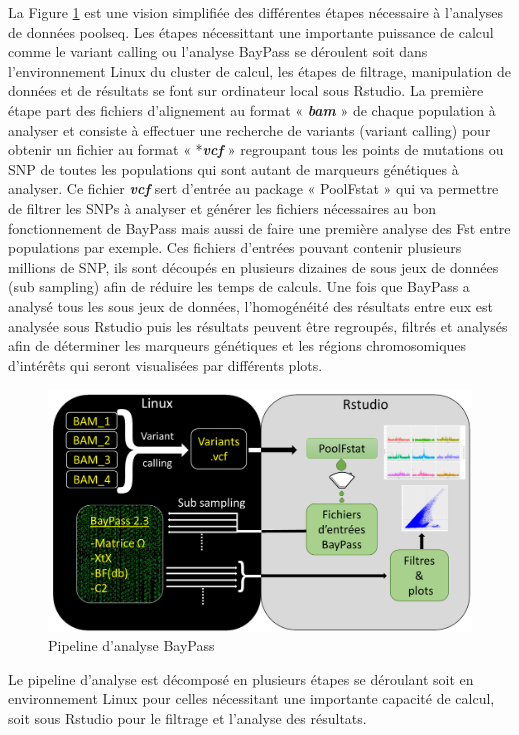\documentclass[
  openany]{book}
\theoremstyle{definition}
\theoremstyle{definition}
\theoremstyle{definition}
\theoremstyle{definition}
\theoremstyle{remark}
\begin{document}
La Figure \ref{fig:Fig1} est une vision simplifiée des différentes étapes nécessaire à l'analyses de données poolseq. Les étapes nécessittant une importante puissance de calcul comme le variant calling ou l'analyse BayPass se déroulent soit dans l'environnement Linux du cluster de calcul, les étapes de filtrage, manipulation de données et de résultats se font sur ordinateur local sous Rstudio.
La première étape part des fichiers d'alignement au format « \textbf{\emph{bam}} » de chaque population à analyser et consiste à effectuer une recherche de variants (variant calling) pour obtenir un fichier au format « *\textbf{\emph{vcf}} » regroupant tous les points de mutations ou SNP de toutes les populations qui sont autant de marqueurs génétiques à analyser. Ce fichier \textbf{\emph{vcf}} sert d'entrée au package « PoolFstat » \citep{gautier_f-statistics_2022} qui va permettre de filtrer les SNPs à analyser et générer les fichiers nécessaires au bon fonctionnement de BayPass mais aussi de faire une première analyse des Fst entre populations par exemple. Ces fichiers d'entrées pouvant contenir plusieurs millions de SNP, ils sont découpés en plusieurs dizaines de sous jeux de données (sub sampling) afin de réduire les temps de calculs. Une fois que BayPass a analysé tous les sous jeux de données, l'homogénéité des résultats entre eux est analysée sous Rstudio puis les résultats peuvent être regroupés, filtrés et analysés afin de déterminer les marqueurs génétiques et les régions chromosomiques d'intérêts qui seront visualisées par différents plots.

\begin{figure}
\includegraphics[width=19.67in]{images/Analyse2} \caption{Pipeline d'analyse BayPass}\label{fig:Fig1}
\end{figure}

Le pipeline d'analyse est décomposé en plusieurs étapes se déroulant soit en environnement Linux pour celles nécessitant une importante capacité de calcul, soit sous Rstudio pour le filtrage et l'analyse des résultats.
\end{document}
